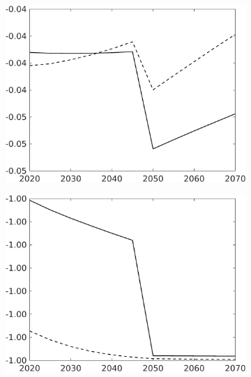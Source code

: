 \begin{figure}[h!!!]
\begin{subfigure}[]{0.32\textwidth}
	\end{subfigure}
	\begin{subfigure}[]{0.32\textwidth}
		\includegraphics[width=1\textwidth]{../../codding_model/own_basedOnFried/optimalPol_010922_revision/figures/all_13Sept22_Tplus30/hl_PercentageLFDyn_Target_regime4_knspil1_spillover0_noskill0_sep0_xgrowth0_PV1_etaa0.79_lgd0.png}
	\end{subfigure}
	\begin{subfigure}[]{0.32\textwidth}
		\includegraphics[width=1\textwidth]{../../codding_model/own_basedOnFried/optimalPol_010922_revision/figures/all_13Sept22_Tplus30/sff_PercentageLFDyn_Target_regime4_knspil1_spillover0_noskill0_sep0_xgrowth0_PV1_etaa0.79_lgd0.png}

\end{subfigure}
\end{figure}
